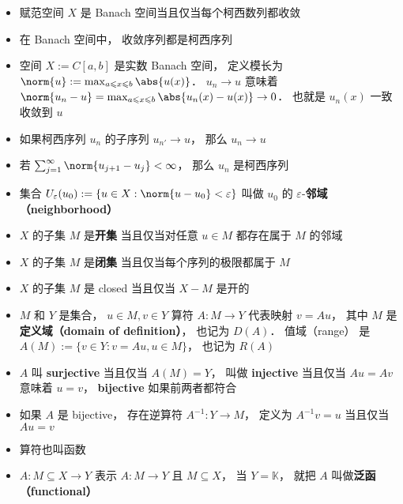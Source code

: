 \begin{itemize}
\item 赋范空间 $X$ 是 Banach 空间当且仅当每个柯西数列都收敛

\item 在 Banach 空间中， 收敛序列都是柯西序列

\item 空间 $X := C[a, b]$ 是实数 Banach 空间， 定义模长为 $\norm{u} := \max_{a \leqslant x \leqslant b} \abs{u(x)}$． $u_n \to u$ 意味着 $\norm{u_n - u} = \max_{a \leqslant x \leqslant b}  \abs{u_n(x) - u(x)} \to 0$． 也就是 $u_n(x)$ 一致收敛到 $u$

\item 如果柯西序列 $u_n$ 的子序列 $u_{n'} \to u$， 那么 $u_n \to u$

\item 若 $\sum_{j=1}^\infty \norm{u_{j+1} - u_j} < \infty$， 那么 $u_n$ 是柯西序列

\item 集合 $U_\varepsilon (u_0) := \{u \in X: \norm{u - u_0} < \varepsilon\}$ 叫做 $u_0$ 的 $\varepsilon$-\textbf{邻域 （neighborhood）}

\item $X$ 的子集 $M$ 是\textbf{开集} 当且仅当对任意 $u \in M$ 都存在属于 $M$ 的邻域

\item $X$ 的子集 $M$ 是\textbf{闭集} 当且仅当每个序列的极限都属于 $M$

\item $X$ 的子集 $M$ 是 closed 当且仅当 $X - M$ 是开的

\item $M$ 和 $Y$ 是集合， $u \in M, v \in Y$ 算符 $A: M \to Y$ 代表映射 $v = Au$， 其中 $M$ 是\textbf{定义域（domain of definition）}， 也记为 $D(A)$． 值域（range） 是 $A(M) := \{v \in Y: v = Au, u \in M\}$， 也记为 $R(A)$

\item $A$ 叫 \textbf{surjective} 当且仅当 $A(M) = Y$， 叫做 \textbf{injective} 当且仅当 $Au = Av$ 意味着 $u = v$， \textbf{bijective} 如果前两者都符合

\item 如果 $A$ 是 bijective， 存在逆算符 $A^{-1}: Y \to M$， 定义为 $A^{-1} v = u$ 当且仅当 $Au = v$

\item 算符也叫函数

\item $A: M \subseteq X \to Y$ 表示 $A: M \to Y$ 且 $M \subseteq X$， 当 $Y = \mathbb K$， 就把 $A$ 叫做\textbf{泛函（functional）}
\end{itemize}

